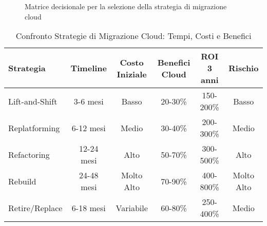 \documentclass[12pt,a4paper]{article}
\begin{document}
\begin{figure}[htbp]
\caption{Matrice decisionale per la selezione della strategia di migrazione cloud}
\label{fig:migration_decision_matrix}
\end{figure}


\begin{table}[htbp]
\centering
\caption{Confronto Strategie di Migrazione Cloud: Tempi, Costi e Benefici}
\label{tab:migration_strategies_comparison}
\begin{tabular}{@{}lccccc@{}}
\toprule
\textbf{Strategia} & \textbf{Timeline} & \textbf{Costo Iniziale} & \textbf{Benefici Cloud} & \textbf{ROI 3 anni} & \textbf{Rischio} \\
\midrule
Lift-and-Shift & 3-6 mesi & Basso & 20-30\% & 150-200\% & Basso \\
\addlinespace
Replatforming & 6-12 mesi & Medio & 30-40\% & 200-300\% & Medio \\
\addlinespace
Refactoring & 12-24 mesi & Alto & 50-70\% & 300-500\% & Alto \\
\addlinespace
Rebuild & 24-48 mesi & Molto Alto & 70-90\% & 400-800\% & Molto Alto \\
\addlinespace
Retire/Replace & 6-18 mesi & Variabile & 60-80\% & 250-400\% & Medio \\
\bottomrule
\end{tabular}
\end{table}

\end{document}
